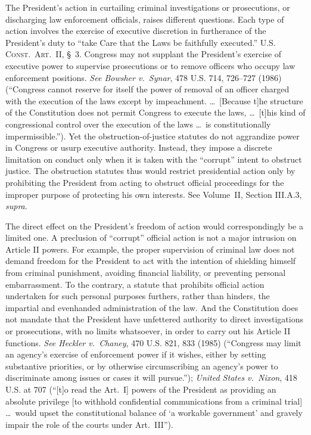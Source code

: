 The President's action in curtailing criminal investigations or prosecutions, or discharging law enforcement officials, raises different questions.
Each type of action involves the exercise of executive discretion in furtherance of the President's duty to ``take Care that the Laws be faithfully executed.''
\textsc{U.S. Const.\ Art.~II}, \S~3.
Congress may not supplant the President's exercise of executive power to supervise prosecutions or to remove officers who occupy law enforcement positions.
\textit{See Bowsher v.\ Synar}, 478 U.S. 714, 726--727 (1986) (``Congress cannot reserve for itself the power of removal of an officer charged with the execution of the laws except by impeachment. \dots\ [Because t]he structure of the Constitution does not permit Congress to execute the laws, \dots\ [t]his kind of congressional control over the execution of the laws \dots\ is constitutionally impermissible.'').
Yet the obstruction-of-justice statutes do not aggrandize power in Congress or usurp executive authority.
Instead, they impose a discrete limitation on conduct only when it is taken with the ``corrupt'' intent to obstruct justice.
The obstruction statutes thus would restrict presidential action only by prohibiting the President from acting to obstruct official proceedings for the improper purpose of protecting his own interests.
See Volume~II, Section III.A.3, \textit{supra}.

The direct effect on the President's freedom of action would correspondingly be a limited one.
A preclusion of ``corrupt'' official action is not a major intrusion on Article II powers.
For example, the proper supervision of criminal law does not demand freedom for the President to act with the intention of shielding himself from criminal punishment, avoiding financial liability, or preventing personal embarrassment.
To the contrary, a statute that prohibits official action undertaken for such personal purposes furthers, rather than hinders, the impartial and evenhanded administration of the law.
And the Constitution does not mandate that the President have unfettered authority to direct investigations or prosecutions, with no limits whatsoever, in order to carry out his Article II functions.
\textit{See Heckler v.\ Chaney}, 470 U.S. 821, 833 (1985) (``Congress may limit an agency's exercise of enforcement power if it wishes, either by setting substantive priorities, or by otherwise circumscribing an agency's power to discriminate among issues or cases it will pursue.'');
\textit{United States v.\ Nixon}, 418 U.S. at 707 (``[t]o read the Art.~I] powers of the President as providing an absolute privilege [to withhold confidential communications from a criminal trial] \dots\ would upset the constitutional balance of `a workable government' and gravely impair the role of the courts under Art.~III'').

